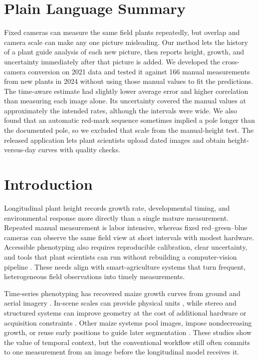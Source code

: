 \documentclass[review,12pt,authoryear]{elsarticle}
\begin{document}
\section*{Plain Language Summary}
Fixed cameras can measure the same field plants repeatedly, but overlap and camera scale can make any one picture misleading. Our method lets the history of a plant guide analysis of each new picture, then reports height, growth, and uncertainty immediately after that picture is added. We developed the cross-camera conversion on 2021 data and tested it against 166 manual measurements from new plants in 2024 without using those manual values to fit the predictions. The time-aware estimate had slightly lower average error and higher correlation than measuring each image alone. Its uncertainty covered the manual values at approximately the intended rates, although the intervals were wide. We also found that an automatic red-mark sequence sometimes implied a pole longer than the documented pole, so we excluded that scale from the manual-height test. The released application lets plant scientists upload dated images and obtain height-versus-day curves with quality checks.

\section{Introduction}

Longitudinal plant height records growth rate, developmental timing, and environmental response more directly than a single mature measurement. Repeated manual measurement is labor intensive, whereas fixed red--green--blue cameras can observe the same field view at short intervals with modest hardware. Accessible phenotyping also requires reproducible calibration, clear uncertainty, and tools that plant scientists can run without rebuilding a computer-vision pipeline \cite{hoyosvillegas2025affordable}. These needs align with smart-agriculture systems that turn frequent, heterogeneous field observations into timely measurements.

Time-series phenotyping has recovered maize growth curves from ground and aerial imagery \cite{ge2016temporal,liang2018timeseries,wang2020functional,rodene2022uav}. In-scene scales can provide physical units \cite{mano2017precise,manoigawa2017nondestructive}, while stereo and structured systems can improve geometry at the cost of additional hardware or acquisition constraints \cite{cai2018stereo,tabb2019cass}. Other maize systems pool images, impose nondecreasing growth, or reuse early positions to guide later segmentation \cite{guo2021kat4ia,guo2023sscnn,gao2022individual,li2023multisource}. These studies show the value of temporal context, but the conventional workflow still often commits to one measurement from an image before the longitudinal model receives it.
\end{document}
